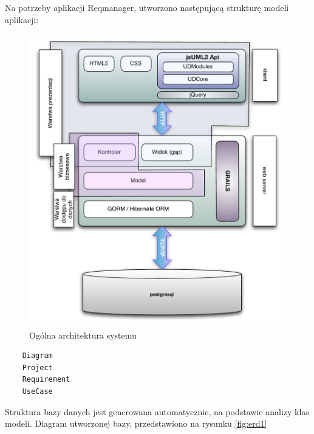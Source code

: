     Na potrzeby aplikacji Reqmanager, utworzono następującą strukturę modeli aplikacji:

    \begin{figure}[p]
      \centering
      \includegraphics[width=1.0\textwidth]{img/reqmanager.pdf}
      \caption{Ogólna architektura systemu}
      \label{fig:reqarch}
    \end{figure}

    \begin{verbatim}
    Diagram 
    Project
    Requirement
    UseCase
    \end{verbatim}

    Struktura bazy danych jest generowana automatycznie, na podstawie analizy klas modeli. Diagram utworzonej bazy, przedstawiono na rysunku \ref{fig:erd1}

